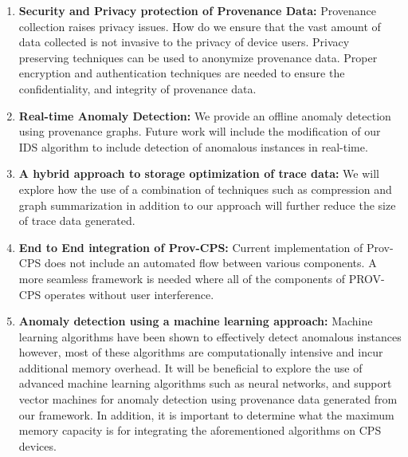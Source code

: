 \begin{enumerate}

\item \textbf{Security and Privacy protection of Provenance Data:} Provenance collection raises privacy issues. How do we ensure that the vast amount of data collected is not invasive to the privacy of device users. Privacy preserving techniques can be used to anonymize provenance data. Proper encryption and authentication techniques \cite{Hasan:2009:CFP:1525908.1525909} are needed to ensure the confidentiality, and integrity of provenance data.

\item \textbf{Real-time Anomaly Detection:} We provide an offline anomaly detection using provenance graphs. Future work will include the modification of our IDS algorithm to include detection of anomalous instances in real-time. 



\item \textbf{A hybrid approach to storage optimization of trace data:} We will explore how the use of a combination of techniques such as compression and graph summarization in addition to our approach will further reduce the size of trace data generated. 

\item \textbf{End to End integration of Prov-CPS:} Current implementation of Prov-CPS does not include an automated flow between various components. A more seamless framework is needed where all of the components of PROV-CPS operates without user interference.

\item \textbf{Anomaly detection using a machine learning approach:} Machine learning algorithms have been shown to effectively detect anomalous instances however, most of these algorithms are computationally intensive and incur additional memory overhead. It will be beneficial to explore the use of advanced machine learning algorithms such as neural networks, and support vector machines for anomaly detection using provenance data generated from our framework. In addition, it is important to determine what the maximum memory capacity is for integrating the aforementioned algorithms on CPS devices.



\end{enumerate}
